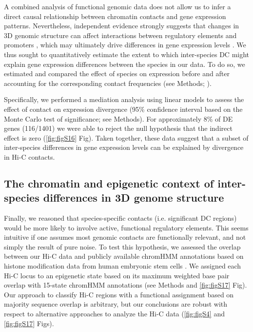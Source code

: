 A combined analysis of functional genomic data does not allow us to infer a direct causal relationship between chromatin contacts and gene expression patterns. Nevertheless, independent evidence strongly suggests that changes in 3D genomic structure can affect interactions between regulatory elements and promoters \cite{Rao.2014, Dily.2014, Chen.2017, Kagey.2010, Lupianez.2015}, which may ultimately drive differences in gene expression levels \cite{Rao.2017, Dily.2014, Chen.2017, Kagey.2010, Lupianez.2015, Siersbaek.2017, Niskanen.2018}. We thus sought to quantitatively estimate the extent to which inter-species DC might explain gene expression differences between the species in our data. To do so, we estimated and compared the effect of species on expression before and after accounting for the corresponding contact frequencies (see Methods; \cite{Baron.1986}).

Specifically, we performed a mediation analysis using linear models to assess the effect of contact on expression divergence (95\% confidence interval based on the Monte Carlo test of significance; see Methods). For approximately 8\% of DE genes (116/1401) we were able to reject the null hypothesis that the indirect effect is zero (\ref{fig:figS16} Fig). Taken together, these data suggest that a subset of inter-species differences in gene expression levels can be explained by divergence in Hi-C contacts.

\subsection{The chromatin and epigenetic context of inter-species differences in 3D genome structure}

Finally, we reasoned that species-specific contacts (i.e. significant DC regions) would be more likely to involve active, functional regulatory elements. This seems intuitive if one assumes most genomic contacts are functionally relevant, and not simply the result of pure noise. To test this hypothesis, we assessed the overlap between our Hi-C data and publicly available chromHMM annotations based on histone modification data from human embryonic stem cells \cite{consortium.2012a}. We assigned each Hi-C locus to an epigenetic state based on its maximum weighted base pair overlap with 15-state chromHMM annotations (see Methods and \ref{fig:figS17} Fig). Our approach to classify Hi-C regions with a functional assignment based on majority sequence overlap is arbitrary, but our conclusions are robust with respect to alternative approaches to analyze the Hi-C data (\ref{fig:figS4} and \ref{fig:figS17} Figs).


